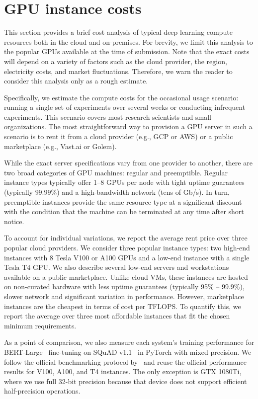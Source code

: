 \section{GPU instance costs}
\label{sect:cloud_costs}

This section provides a brief cost analysis of typical deep learning compute resources both in the cloud and on-premises.
For brevity, we limit this analysis to the popular GPUs available at the time of submission. Note that the exact costs will depend on a variety of factors such as the cloud provider, the region, electricity costs, and market fluctuations. Therefore, we warn the reader to consider this analysis only as a rough estimate. 

Specifically, we estimate the compute costs for the occasional usage scenario: running a single set of experiments over several weeks or conducting infrequent experiments. This scenario covers most research scientists and small organizations. The most straightforward way to provision a GPU server in such a scenario is to rent it from a cloud provider (e.g., GCP or AWS) or a public marketplace (e.g., Vast.ai or Golem).

While the exact server specifications vary from one provider to another, there are two broad categories of GPU machines: regular and preemptible. Regular instance types typically offer 1--8 GPUs per node with tight uptime guarantees (typically $99.99\%$) and a high-bandwidth network (tens of Gb/s). In turn, preemptible instances provide the same resource type at a significant discount with the condition that the machine can be terminated at any time after short notice.

To account for individual variations, we report the average rent price over three popular cloud providers.
We consider three popular instance types: two high-end instances with 8 Tesla V100 or A100 GPUs and a low-end instance with a single Tesla T4 GPU.
We also describe several low-end servers and workstations available on a public marketplace. Unlike cloud VMs, these instances are hosted on non-curated hardware with less uptime guarantees (typically 95\% -- 99.9\%), slower network and significant variation in performance. However, marketplace instances are the cheapest in terms of cost per TFLOPS. To quantify this, we report the average over three most affordable instances that fit the chosen minimum requirements.

As a point of comparison, we also measure each system's training performance for BERT-Large~\cite{bert} fine-tuning on SQuAD v1.1~\cite{squad} in PyTorch with mixed precision. We follow the official benchmarking protocol by~\cite{nvidia_perf} and reuse the official performance results for V100, A100, and T4 instances. The only exception is GTX 1080Ti, where we use full 32-bit precision because that device does not support efficient half-precision operations.

